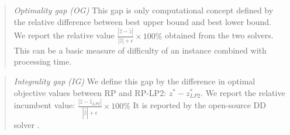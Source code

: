 \begin{quote}
	\noindent\textit{Optimality gap (OG)} This gap is only computational concept defined by the relative difference between best upper bound and best lower bound. We report the relative value $\frac{|\hat{z}-\tilde{z}|}{|\hat{z}|+\epsilon}\times 100\%$ obtained from the two solvers. This can be a basic measure of difficulty of an instance combined with processing time.
\end{quote}


\begin{quote}
	\noindent\textit{Integrality gap (IG)} We define this gap by the difference in optimal objective values between RP and RP-LP2: $z^*-z^*_{LP2}$. We report the relative incumbent value: $\frac{|\hat{z}-\hat{z}_{LP2}|}{|\hat{\hat{z}}|+\epsilon}\times 100\%$ It is reported by the open-source DD solver \dsp. 
	
\end{quote}

